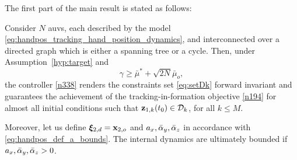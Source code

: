 The first part of the main result is stated as follows:
\begin{prop}\label{thm:USV}
	Consider $N$ \glspl{auv}, each described by the model \eqref{eq:handpos_tracking_hand_position_dynamics}, and interconnected over a directed graph which is either a spanning tree or a cycle.
	Then, under Assumption~\ref{hyp:target} and
	\begin{equation}
		\gamma\geq\bar\mu^*+\sqrt{2N}\bar\mu_o, \label{590}
	\end{equation}
	the controller \eqref{n338} renders the constraints set \eqref{eq:setDk} forward invariant and guarantees the achievement of the tracking-in-formation objective \eqref{n194} for almost all initial conditions such that $\mathbf{z}_{1, k}(t_0)\in\mathcal{D}_k$, for all $k\leq M$.

	Moreover, let us define $\bm{\xi}_{2, d} = \mathbf{x}_{2, o}$ and $a_x, \Bar{\alpha}_y, \Bar{\alpha}_z$ in accordance with \eqref{eq:handpos_def_a_bounds}.
	The internal dynamics are ultimately bounded if $a_x, \Bar{\alpha}_y, \Bar{\alpha}_z > 0$.
\end{prop}


